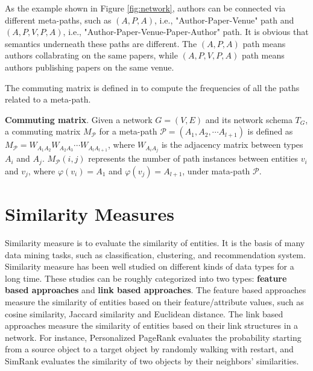 \documentclass{acm_proc_article-csis8101}
\begin{document}
\begin{example}
As the example shown in Figure \ref{fig:network}, authors can be connected via different meta-paths, such as $(A,P,A)$, i.e., "Author-Paper-Venue" path and $(A,P,V,P,A)$, i.e., "Author-Paper-Venue-Paper-Author" path. It is obvious that semantics underneath these paths are different. The $(A,P,A)$ path means authors collabrating on the same papers, while $(A,P,V,P,A)$ path means authors publishing papers on the same venue.
\end{example}

The commuting matrix is defined in \cite{sun2011pathsim} to compute the frequencies of all the paths related to a meta-path.

\begin{definition}
{\bf Commuting matrix}. Given a network $G=(V,E)$ and its network schema $T_{G}$, a commuting matrix $M_{\mathcal{P}}$ for a meta-path $\mathcal{P}=(A_{1}, A_{2}, \cdots A_{l+1})$ is defined as $M_{\mathcal{P}}=W_{A_{1}A_{2}}W_{A_{2}A_{3}} \cdots W_{A_{l}A_{l+1}}$, where $W_{A_{i}A_{j}}$ is the adjacency matrix between types $A_{i}$ and $A_{j}$. $M_{\mathcal{P}}(i, j)$ represents the number of path instances between entities $v_{i}$ and $v_{j}$, where $\varphi(v_{i})=A_{1}$ and $\varphi(v_{j})=A_{l+1}$, under mata-path $\mathcal{P}$.
\end{definition}

\section{Similarity Measures}

Similarity measure is to evaluate the similarity of entities. It is the basis of many data mining tasks, such as classification, clustering, and recommendation system. Similarity measure has been well studied on different kinds of data types for a long time. These studies can be roughly categorized into two types: {\bf feature based approaches} and {\bf link based approaches}. The feature based approaches measure the similarity of entities based on their feature/attribute values, such as cosine similarity, Jaccard similarity and Euclidean distance. The link based approaches measure the similarity of entities based on their link structures in a network. For instance, Personalized PageRank \cite{jeh2003scaling} evaluates the probability starting from a source object to a target object by randomly walking with restart, and SimRank\cite{jeh2002simrank} evaluates the similarity of two objects by their neighbors' similarities.
\end{document}
